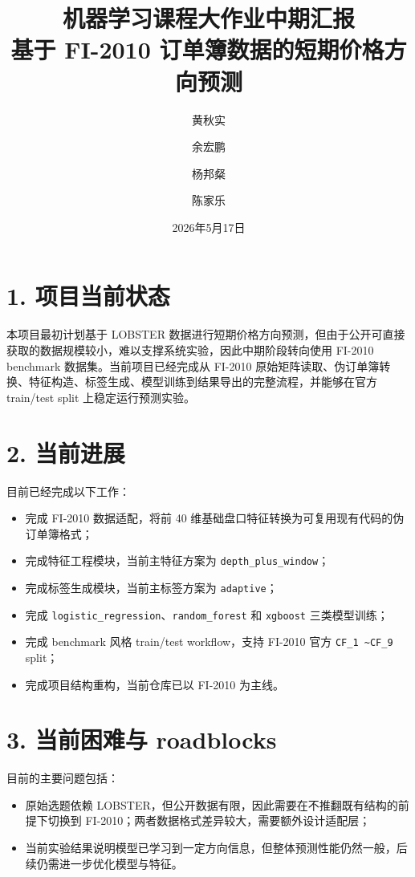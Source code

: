\documentclass[11pt]{ctexart}
\title{机器学习课程大作业中期汇报\\
基于 FI-2010 订单簿数据的短期价格方向预测}
\author{黄秋实 \and 余宏鹏 \and 杨邦粲 \and 陈家乐}
\date{2026年5月17日}
\begin{document}
\maketitle

\section*{1. 项目当前状态}
本项目最初计划基于 LOBSTER 数据进行短期价格方向预测，但由于公开可直接获取的数据规模较小，难以支撑系统实验，因此中期阶段转向使用 FI-2010 benchmark 数据集。当前项目已经完成从 FI-2010 原始矩阵读取、伪订单簿转换、特征构造、标签生成、模型训练到结果导出的完整流程，并能够在官方 train/test split 上稳定运行预测实验。

\section*{2. 当前进展}
目前已经完成以下工作：
\begin{itemize}[leftmargin=*]
    \item 完成 FI-2010 数据适配，将前 40 维基础盘口特征转换为可复用现有代码的伪订单簿格式；
    \item 完成特征工程模块，当前主特征方案为 \texttt{depth\_plus\_window}；
    \item 完成标签生成模块，当前主标签方案为 \texttt{adaptive}；
    \item 完成 \texttt{logistic\_regression}、\texttt{random\_forest} 和 \texttt{xgboost} 三类模型训练；
    \item 完成 benchmark 风格 train/test workflow，支持 FI-2010 官方 \texttt{CF\_1 \textasciitilde CF\_9} split；
    \item 完成项目结构重构，当前仓库已以 FI-2010 为主线。
\end{itemize}

\section*{3. 当前困难与 roadblocks}
目前的主要问题包括：
\begin{itemize}[leftmargin=*]
    \item 原始选题依赖 LOBSTER，但公开数据有限，因此需要在不推翻既有结构的前提下切换到 FI-2010；两者数据格式差异较大，需要额外设计适配层；
    \item 当前实验结果说明模型已学习到一定方向信息，但整体预测性能仍然一般，后续仍需进一步优化模型与特征。
\end{itemize}
\end{document}
